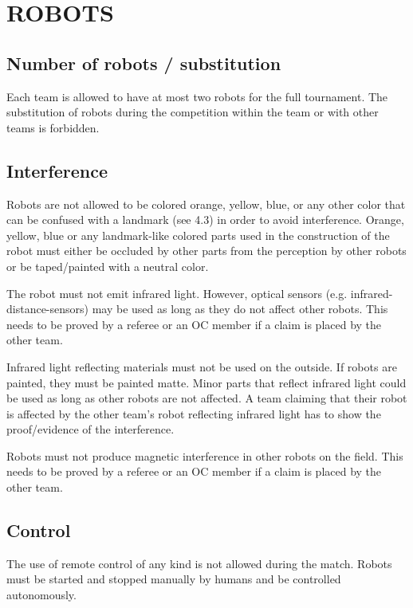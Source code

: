 \documentclass{article}
\begin{document}
\section{ROBOTS\label{ref-018}}

\subsection{ Number of robots / substitution \label{ref-019}}

Each team is allowed to have at most two robots for the full tournament. The substitution of robots during the competition within the team or with other teams is forbidden.

\subsection{ Interference \label{ref-020}}

Robots are not allowed to be colored orange, yellow, blue, or any other color that can be confused with a landmark (see 4.3) in order to avoid interference. Orange, yellow, blue or any landmark-like colored parts used in the construction of the robot must either be occluded by other parts from the perception by other robots or be taped/painted with a neutral color.

The robot must not emit infrared light. However, optical sensors (e.g. infrared-distance-sensors) may be used as long as they do not affect other robots. This needs to be proved by a referee or an OC member if a claim is placed by the other team.

Infrared light reflecting materials must not be used on the outside. If robots are painted, they must be painted matte. Minor parts that reflect infrared light could be used as long as other robots are not affected. A team claiming that their robot is affected by the other team's robot reflecting infrared light has to show the proof/evidence of the interference.

Robots must not produce magnetic interference in other robots on the field. This needs to be proved by a referee or an OC member if a claim is placed by the other team.

\subsection{ Control \label{ref-021}}

The use of remote control of any kind is not allowed during the match. Robots must be started and stopped manually by humans and be controlled autonomously.
\end{document}
